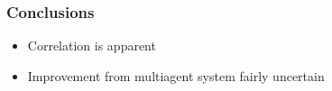 \documentclass{beamer}
\begin{document}
	\begin{frame}
		\frametitle{Conclusions}
		\begin{itemize}
			\item Correlation is apparent
			\item Improvement from multiagent system fairly uncertain
		\end{itemize}
	\end{frame}

%
\end{document}
